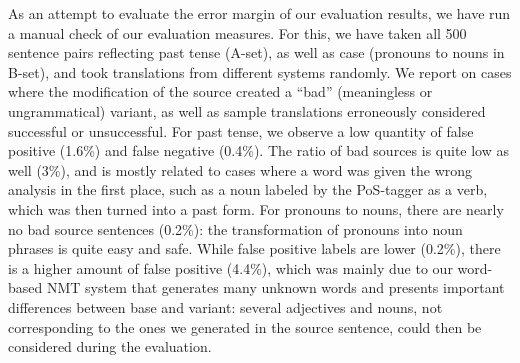 \documentclass[11pt,letterpaper,final,nohyperref]{article}
\begin{document}
As an attempt to evaluate the error margin of our evaluation results,
we have run a manual check of our evaluation measures.
For this, we have taken all 500 sentence pairs reflecting past
tense (A-set), as well as case (pronouns to nouns in B-set), and took translations from different
systems randomly. We report on cases where the modification of the source created
a ``bad'' (meaningless or ungrammatical) variant,
as well as sample translations erroneously considered
successful or unsuccessful. For past tense, we observe a low
quantity of false positive (1.6\%) and false negative (0.4\%). The
ratio of bad sources is quite low as well (3\%), and is
mostly related to cases where a word was given the wrong
analysis in the first place, such as a noun labeled
by the PoS-tagger as a verb, which was then turned
into a past form. For pronouns to nouns, there are
nearly no bad source sentences (0.2\%): the transformation of
pronouns into noun phrases is quite easy and safe.
While false positive labels are lower (0.2\%), there is a higher amount of false
positive (4.4\%), which was mainly due to our word-based
NMT system that generates many unknown words and presents
important differences between base and variant: several
adjectives and nouns, not corresponding to the ones we generated
in the source sentence, could then be considered during the
evaluation.

\end{document}
